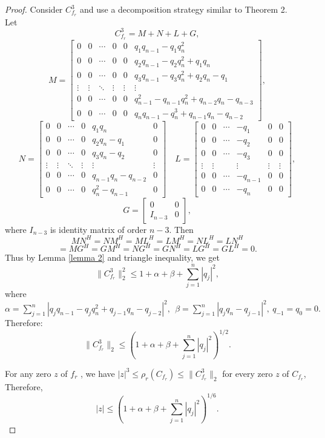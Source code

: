 \documentclass[10pt,a4paper]{amsart}
\begin{document}
\begin{proof}
    Consider $C_{f_{r}}^3$ and use a decomposition strategy similar to Theorem 2. \\Let
\[
C_{f_r}^3 = M + N + L + G,
\]
\[M = 
\begin{bmatrix}
0 & 0 & \cdots & 0&0 & q_{1}q_{n-1}-q_{1}q^{2}_{n} \\
0 & 0 & \cdots & 0&0& q_{2}q_{n-1}-q_{2}q^{2}_{n}+q_{1}q_{n}\\
0 & 0 & \cdots & 0 &0& q_{3}q_{n-1}-q_{3}q^{2}_{n}+q_{2}q_{n}-q_{1}\\
\vdots  &\vdots & \ddots &\vdots& \vdots & \vdots \\
0 & 0 & \cdots & 0 & 0&q^{2}_{n-1}-q_{n-1}q^{2}_{n}+q_{n-2}q_{n}-q_{n-3}\\
0 & 0 & \cdots & 0 & 0&q_{n}q_{n-1}-q^{3}_{n}+q_{n-1}q_{n}-q_{n-2}
\end{bmatrix},
\]
\[
N = 
\begin{bmatrix}
0 & 0 & \cdots & 0&q_{1}q_{n} & 0 \\
0 & 0 & \cdots & 0&q_{2}q_{n}-q_{1}& 0 \\
0 & 0 & \cdots & 0 &q_{3}q_{n}-q_{2}& 0 \\
\vdots  &\vdots & \ddots &\vdots& \vdots & \vdots \\
0 & 0 & \cdots & 0 & q_{n-1}q_{n}-q_{n-2}&0\\
0 & 0 & \cdots & 0 &q^{2}_{n}-q_{n-1}&0
\end{bmatrix}
\quad
L= 
\begin{bmatrix}
0 & 0 & \cdots  &-q_{1} & 0 &0\\
0 & 0 & \cdots  &-q_{2}& 0&0 \\
0 & 0 & \cdots  &-q_{3}& 0&0 \\
\vdots  &\vdots &  &\vdots& \vdots & \vdots \\
0 & 0 & \cdots  & -q_{n-1}&0&0\\
0 & 0 & \cdots  & -q_{n}&0&0
\end{bmatrix},
\]
\[
 G=\begin{bmatrix}
    0&0\\I_{n-3}&0
\end{bmatrix},\]
where $I_{n-3} $ is identity matrix of order $n-3.$
Then
\[
 MN^{H}=NM^{H}=ML^{H}= LM^{H} = NL^{H}=L N^{H}\]\[=MG^{H}=GM^{H}=NG^{H}=GN^{H} =LG^H=GL^{H}=0.
\]
Thus by Lemma \ref{lemma 2} and triangle inequality, we get\\


\[
\|C_{f_{r}}^3\|^2_{2} \leq 1 + \alpha+\beta + \sum_{j=1}^{n} |q_j|^2,
\]
 where 
$\alpha=\sum_{j=1}^{n}|q_{j}q_{n-1}-q_{j}q^{2}_{n}+q_{j-1}q_{n}-q_{j-2}|^{2},~~\beta=\sum_{j=1}^{n}|q_{j}q_{n}-q_{j-1}|^{2},~ q_{-1}=q_{0}=0.$
Therefore:
\[
\|C_{f_{r}}^3\|_{2} \leq \left( 1 + \alpha+\beta + \sum_{j=1}^{n} |q_j|^2\right)^{1/2}.
\]

\noindent For any zero $z$ of $f_{r}$ , we have $|z|^{3}\le \rho_{r}(C_{f_{r}}) \leq \|C_{f_{r}}^3\|_{2}$ for every zero  $z$ of $C_{f_{r}}$, Therefore,
\[
|z| \leq \left(1 + \alpha+\beta + \sum_{j=1}^{n} |q_j|^2 \right)^{1/6}.\]
\end{proof}
\end{document}
